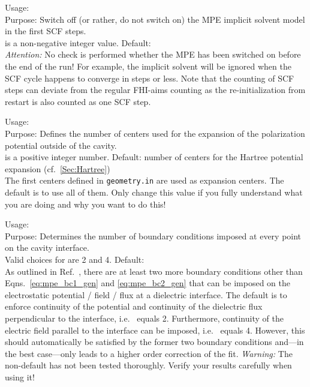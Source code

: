 {
  \noindent
  Usage:   \\[1.0ex] 
  Purpose: Switch off (or rather, do not switch on) the 
    MPE implicit solvent model in the first 
     SCF steps. \\[1.0ex]
   is a non-negative integer value. Default:  \\
}
\emph{Attention:} No check is performed whether the MPE 
has been switched on before the end of the run! For example, 
the implicit solvent will be ignored when the SCF cycle 
happens to converge in  steps or less. 
Note that the counting of SCF steps can deviate from the 
regular FHI-aims counting as the re-initialization 
from restart is also counted as one SCF step. 

{
  \noindent
  Usage:   \\[1.0ex] 
  Purpose: Defines the number of centers used 
    for the expansion of the polarization potential 
    outside of the cavity. \\[1.0ex]
   is a positive integer number. 
    Default: number of centers for the Hartree 
    potential expansion (cf.~\ref{Sec:Hartree}) \\
}
The first  centers defined in 
\texttt{geometry.in} are used as expansion centers. 
The default is to use all of them. Only change this 
value if you fully understand what you are doing and 
why you want to do this! 


{
  \noindent
  Usage:   \\[1.0ex] 
  Purpose: Determines the number of boundary conditions 
    imposed at every point on the cavity interface. \\[1.0ex]
  Valid choices for  are 2 and 4. Default:  \\
}
As outlined in Ref.~\cite{Sinstein2017_MPE}, there are at least 
two more boundary conditions other than Eqns.~\ref{eq:mpe_bc1_gen} 
and \ref{eq:mpe_bc2_gen} that can be imposed on the electrostatic 
potential / field / flux at a dielectric interface. 
The default is to enforce continuity of the potential and 
continuity of the dielectric flux perpendicular to the interface, 
i.e.~ equals 2. 
Furthermore, continuity of the electric field parallel to the 
interface can be imposed, i.e.~ equals 4. 
However, this should automatically be satisfied by the former 
two boundary conditions and---in the best case---only leads to 
a higher order correction of the fit. 
\emph{Warning:} The non-default has not been tested thoroughly. 
Verify your results carefully when using it! 


